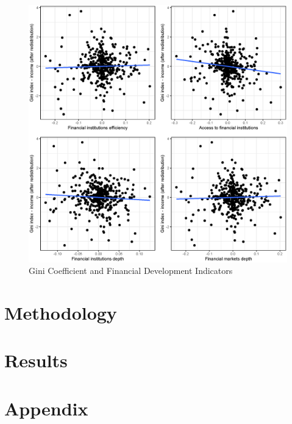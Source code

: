 \documentclass[a4paper,11pt]{article}
\begin{document}
\begin{figure}
    \caption{Gini Coefficient and Financial Development Indicators}
\includegraphics[width=\textwidth, keepaspectratio]{figures/plots_findev_gini_dm}
\end{figure}

%
%
\section{Methodology}

\section{Results}


\clearpage
%


%
\clearpage
%
\appendix
\section{Appendix}

\renewcommand{\thesection}{A\arabic{section}}%
\renewcommand{\thetable}{A\arabic{table}}%
\renewcommand{\thefigure}{A\arabic{figure}}%
\renewcommand{\theequation}{A\arabic{eq}} 
\end{document}
